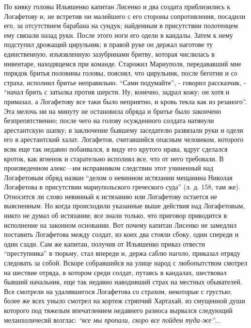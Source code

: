 \documentclass[a4paper,20pt]{article}
\begin{document}
По кивку головы Ильяшенко капитан Лисенко и два
создата приблизились к Логафетову и, не встретив ни
малейшего с его стороны сопротивления, посадили его, за
отсутствием барабана на сундук; найденным в присутствии полотенцем
ему связали назад руки. После этого
ноги его одели в кандалы. Затем к нему подступил
дрожащий цирульник; в правой руке он держал наготове 
ту единственную, изъязвленную зазубринами бритву,
которая числилась в инвентаре, находящемся при команде.
Старожил Мариуполя, передававший мне порядок бритья
половины головы, пояснял, что цирульник, после беготни
и со страха, исполнил бритье неправильно. 
``Сами подумайте'', - говорил рассказчик, -  ``начал брить с затылка
против шерсти. Ну, конечно, задрал кожу; он хотя и
примазал, а Логафетову все таки было неприятно, и кровь
текла как из резаного''. Эта мелочь ни на минуту не
остановила обряда и бритье было закончено безпрепятственно;
после чего на голову осужденного солдата натянули арестантскую шапку; 
в заключение бывшему заседателю развязали руки и одели его в арестантский халат. Логафетов,
считавшийся опасным человеком, которого всяк еще так
недавно побаивался, в виду его крутого нрава, вдруг сделался
кроток, как ягненок и старательно исполнял все,
что от него требовали. В произведенном алекс—им исправником 
следствии этот учиненный над Логафетовым
обряд назван ``делом о невинном истязании мещанина
Николая Логафетова в присутствии мариупольского греческого
суда'' (л. д. 158, там же). Относится ли слово невинный
к истязанию или Логафетову остается не выясненным. Но
когда происходили указанные выше действия над Логафетовым, 
никто не думал об истязании; все знали только,
что приговор приводится в исполнение на законном основании. 
Вот почему капитан Лисенко не замедлил поставить Логафетова между солдат, из коих два стояли
сбоку, один спереди и один сзади. 
Сам же капитан, получив от Ильяшенко приказ отвести ``преступника'' в
тюрьму, стал впереди и, держа саблю наголо, приказал
отряду следовать за собой. Вскоре собравшийся на улице
народ с любопытством смотрел на шествие отряда, в
котором среди солдат, путаясь в кандалах, шествовал
бывший начальник, еще так недавно наводивший страх
на местных обывателей. Все смотрели на удалявшегося Логафетова со страхом,
некоторые с грустью; более же всех
уныло смотрел на кортеж стряпчий Хартахай, из смущенной души которого 
под тяжелым впечатлением недавнего
разноса вырвался следующий меланхоличесвй возглас: \emph{``все
мы пропали, скоро все пойдем туда-же''}...
\end{document}
